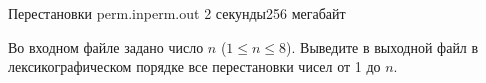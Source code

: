 \begin{problem}{Перестановки}
{perm.in}{perm.out}
{2 секунды}{256 мегабайт}

Во входном файле задано число $n$ ($1 \le n \le 8$).
Выведите в выходной файл в лексикографическом
порядке все перестановки чисел от 1 до $n$.

\Example

\begin{example}
%
\end{example}
    
\end{problem}
